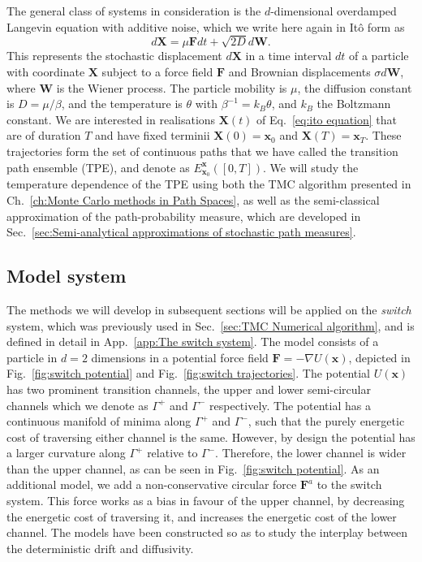 The general class of systems in consideration is the $d$-dimensional overdamped Langevin equation with additive noise, which we write here again in Itô form as
\begin{equation} \label{eq:ito equation again}
d\mathbf{X}=\mu\mathbf{F}dt+\sqrt{2D}d\mathbf{W}. 
\end{equation}
This represents the stochastic displacement $d\mathbf{X}$ in a time
interval $dt$ of a particle with coordinate $\mathbf{X}$ subject
to a force field $\mathbf{F}$ and Brownian displacements $\sigma d\mathbf{W}$,
where $\mathbf{W}$ is the Wiener process. The particle mobility is
$\mu$, the diffusion constant is $D=\mu/\beta$, and the temperature
is $\theta$ with $\beta^{-1}=k_{B}\theta$, and $k_{B}$ the Boltzmann
constant. We are interested in realisations $\mathbf{X}(t)$ of Eq.~\ref{eq:ito equation}
that are of duration $T$ and have fixed terminii $\mathbf{X}(0)=\mathbf{x}_{0}$
and $\mathbf{X}(T)=\mathbf{x}_{T}$. These trajectories form the set
of continuous paths that we have called the transition path ensemble (TPE), and denote as $E_{\mathbf{x}_0}^{\mathbf{x}}([0,T])$. We will study the temperature dependence of the TPE using both the TMC algorithm presented in Ch.~\ref{ch:Monte Carlo methods in Path Spaces}, as well as the semi-classical approximation of the path-probability measure, which are developed in Sec.~\ref{sec:Semi-analytical approximations of stochastic path measures}.

\subsection{Model system}

The methods we will develop in subsequent sections will be applied on the \textit{switch} system, which was previously used in Sec.~\ref{sec:TMC Numerical algorithm}, and is defined in detail in App.~\ref{app:The switch system}.
The model consists of a particle in $d=2$ dimensions in a potential force field $\mathbf{F}=-\nabla U(\mathbf{x})$, depicted in Fig.~\ref{fig:switch potential} and Fig.~\ref{fig:switch trajectories}.
The potential $U(\mathbf{x})$ has two prominent transition channels, the upper and lower semi-circular channels which we denote as $\Gamma^{+}$ and $\Gamma^{-}$ respectively. The potential has a continuous manifold of minima along $\Gamma^{+}$ and $\Gamma^{-}$, such that the purely energetic cost of traversing either channel is the same. However, by design the potential has a larger curvature along $\Gamma^{+}$ relative to $\Gamma^{-}$. Therefore, the lower channel is wider than the upper channel, as can be seen in Fig.~\ref{fig:switch potential}. As an additional model, we add a non-conservative circular force $\mathbf{F}^{a}$ to the switch system. This force works as a bias in favour of the upper channel, by decreasing the energetic cost of traversing it, and increases the energetic cost of the lower channel. The models have been constructed so as to study the interplay between the deterministic drift and diffusivity.

